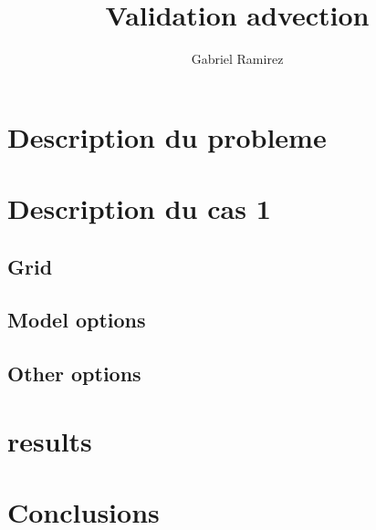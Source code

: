 \documentclass[12pt,a4paper]{article}
\author{Gabriel Ramirez}
\title{Validation advection}
\begin{document}
\section{Description du probleme}

\section{Description du cas 1}
\subsection{Grid}

\subsection{Model options}

\subsection{Other options}

\section{results}





\section{Conclusions}

%
\newpage
\printbibliography
\end{document}
